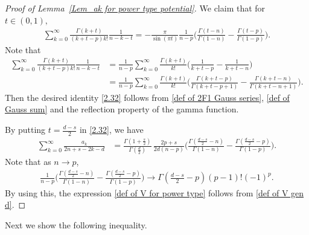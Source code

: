 \documentclass[10pt]{amsart}
\theoremstyle{plain}
\theoremstyle{remark}
\numberwithin{equation}{section}
\begin{document}
\begin{proof}[Proof of Lemma~\ref{Lem_ak for power type potential}]
We claim that for $t \in (0,1),$
\begin{align}\label{2.32}
 \sum_{k=0}^\infty \frac{ \Gamma(k+t) }{ (k+t-p)k! } \frac{1}{ n-k-t }= -\frac{\pi}{ \sin(\pi t) }  \frac{1}{ n-p  } \Big(  \frac{ \Gamma( t-n ) }{ \Gamma(1-n) }-\frac{ \Gamma( t-p ) }{ \Gamma(1-p) } \Big).
\end{align}
Note that 
\begin{align*}
 \sum_{k=0}^\infty \frac{ \Gamma(k+t) }{ (k+t-p)k! } \frac{1}{ n-k-t } &= \frac{1}{n-p} \sum_{k=0}^\infty \frac{ \Gamma(k+t) }{ k! } \Big(\frac{1}{k+t-p}-\frac{1}{ k+t-n }\Big) 
\\
&= \frac{1}{n-p} \sum_{k=0}^\infty \frac{ \Gamma(k+t) }{ k! } \Big(\frac{ \Gamma(k+t-p) }{\Gamma(k+t-p+1)}-\frac{\Gamma(k+t-n)}{ \Gamma(k+t-n+1) }\Big) .
\end{align*} 
Then the desired identity \eqref{2.32} follows from \eqref{def of 2F1 Gauss series}, \eqref{def of Gauss sum} and the reflection property of the gamma function. 

By putting $t=\frac{d-s}{2}$ in \eqref{2.32}, we have 
\begin{align} \label{2.33}
 \sum_{k=0}^\infty \frac{ a_k}{ 2n+s-2k-d } &=    \frac{\Gamma(1+\frac{s}{2})}{ \Gamma( \frac{d}{2} ) } \, \frac{2p+s}{ 2d( n-p ) } \Big(  \frac{ \Gamma( \frac{d-s}{2}-n ) }{ \Gamma(1-n) }-\frac{ \Gamma( \frac{d-s}{2}-p ) }{ \Gamma(1-p) } \Big).
\end{align}
Note that as $n \to p$,  
\begin{align*}
\frac{1}{n-p}  \Big(  \frac{ \Gamma( \frac{d-s}{2}-n ) }{ \Gamma(1-n) }-\frac{ \Gamma( \frac{d-s}{2}-p ) }{ \Gamma(1-p) } \Big)  \to \Gamma(\tfrac{d-s}{2}-p) (p-1)! (-1)^p. 
\end{align*}
By using this, the expression \eqref{def of V for power type} follows from \eqref{def of V gen d}. 
\end{proof}
 


Next we show the following inequality. 
\end{document}
